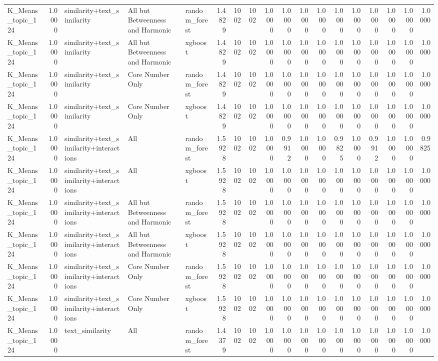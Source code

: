 \begin{tabular}{lrlllrrrrrrrrrrrrr}
K_Means_topic_124 & 1.0000 & similarity+text_similarity & All but Betweenness and Harmonic & random_forest & 1.4829 & 1002 & 1002 & 1.0000 & 1.0000 & 1.0000 & 1.0000 & 1.0000 & 1.0000 & 1.0000 & 1.0000 & 1.0000 & 1.0000 \\
K_Means_topic_124 & 1.0000 & similarity+text_similarity & All but Betweenness and Harmonic & xgboost & 1.4829 & 1002 & 1002 & 1.0000 & 1.0000 & 1.0000 & 1.0000 & 1.0000 & 1.0000 & 1.0000 & 1.0000 & 1.0000 & 1.0000 \\
K_Means_topic_124 & 1.0000 & similarity+text_similarity & Core Number Only & random_forest & 1.4829 & 1002 & 1002 & 1.0000 & 1.0000 & 1.0000 & 1.0000 & 1.0000 & 1.0000 & 1.0000 & 1.0000 & 1.0000 & 1.0000 \\
K_Means_topic_124 & 1.0000 & similarity+text_similarity & Core Number Only & xgboost & 1.4829 & 1002 & 1002 & 1.0000 & 1.0000 & 1.0000 & 1.0000 & 1.0000 & 1.0000 & 1.0000 & 1.0000 & 1.0000 & 1.0000 \\
K_Means_topic_124 & 1.0000 & similarity+text_similarity+interactions & All & random_forest & 1.5928 & 1002 & 1002 & 1.0000 & 0.9912 & 1.0000 & 1.0000 & 0.9825 & 1.0000 & 0.9912 & 1.0000 & 1.0000 & 0.9825 \\
K_Means_topic_124 & 1.0000 & similarity+text_similarity+interactions & All & xgboost & 1.5928 & 1002 & 1002 & 1.0000 & 1.0000 & 1.0000 & 1.0000 & 1.0000 & 1.0000 & 1.0000 & 1.0000 & 1.0000 & 1.0000 \\
K_Means_topic_124 & 1.0000 & similarity+text_similarity+interactions & All but Betweenness and Harmonic & random_forest & 1.5928 & 1002 & 1002 & 1.0000 & 1.0000 & 1.0000 & 1.0000 & 1.0000 & 1.0000 & 1.0000 & 1.0000 & 1.0000 & 1.0000 \\
K_Means_topic_124 & 1.0000 & similarity+text_similarity+interactions & All but Betweenness and Harmonic & xgboost & 1.5928 & 1002 & 1002 & 1.0000 & 1.0000 & 1.0000 & 1.0000 & 1.0000 & 1.0000 & 1.0000 & 1.0000 & 1.0000 & 1.0000 \\
K_Means_topic_124 & 1.0000 & similarity+text_similarity+interactions & Core Number Only & random_forest & 1.5928 & 1002 & 1002 & 1.0000 & 1.0000 & 1.0000 & 1.0000 & 1.0000 & 1.0000 & 1.0000 & 1.0000 & 1.0000 & 1.0000 \\
K_Means_topic_124 & 1.0000 & similarity+text_similarity+interactions & Core Number Only & xgboost & 1.5928 & 1002 & 1002 & 1.0000 & 1.0000 & 1.0000 & 1.0000 & 1.0000 & 1.0000 & 1.0000 & 1.0000 & 1.0000 & 1.0000 \\
K_Means_topic_124 & 1.0000 & text_similarity & All & random_forest & 1.4379 & 1002 & 1002 & 1.0000 & 1.0000 & 1.0000 & 1.0000 & 1.0000 & 1.0000 & 1.0000 & 1.0000 & 1.0000 & 1.0000 \\

\end{tabular}
